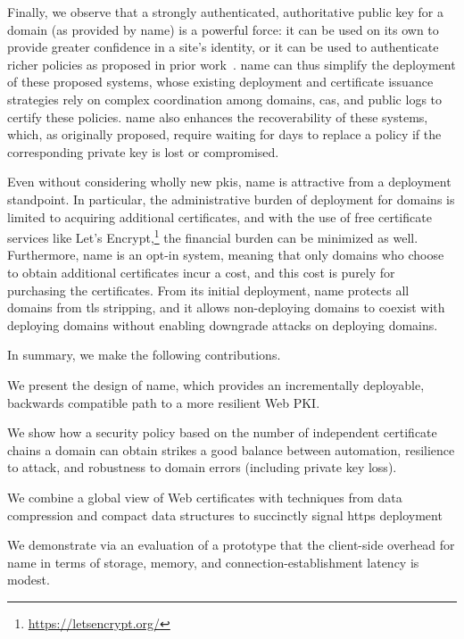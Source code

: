 Finally, we observe that a strongly authenticated, authoritative public key
for a domain (as provided by \ac{name}) is a powerful force: it can be used on its own to provide greater
confidence in a site's identity, or it can be used to authenticate richer
policies as proposed in prior work~\cite{basin2014arpki,
szalachowski2014policert}. \ac{name} can thus simplify the deployment of these
proposed systems, whose existing deployment and certificate issuance strategies
rely on complex coordination among domains, \acp{ca}, and public logs to certify
these policies. \ac{name} also enhances the recoverability of these systems,
which, as originally proposed, require waiting for days to replace a policy if
the corresponding private key is lost or compromised.

Even without considering wholly new \acp{pki}, \ac{name} is attractive from a
deployment standpoint. In particular, the administrative burden of deployment
for domains is limited to acquiring additional certificates, and with the use of
free certificate services like Let's
Encrypt,\footnote{\url{https://letsencrypt.org/}} the financial burden can be
minimized as well. Furthermore, \ac{name} is an opt-in system, meaning that only
domains who choose to obtain additional certificates incur a cost, and this cost
is purely for purchasing the certificates. From its initial deployment,
\ac{name} protects all domains from \ac{tls} stripping, and it allows
non-deploying domains to coexist with deploying domains without enabling
downgrade attacks on deploying domains.

In summary, we make the following contributions.
\begin{compactitem}
\item\medskip We present the design of \ac{name}, which provides an incrementally deployable,
      backwards compatible path to a more resilient Web PKI.
\item\medskip We show how a security policy based on the number of independent certificate chains
      a domain can obtain strikes a good balance between automation, 
      resilience to attack, and robustness to domain errors (including private key loss).
\item\medskip We combine a global view of Web certificates with techniques from data
      compression and compact data structures to succinctly signal \ac{https} deployment
\item\medskip We demonstrate via an evaluation of a prototype that the client-side overhead for
      \ac{name} in terms of storage, memory, and connection-establishment latency is
      modest. 
\end{compactitem}

